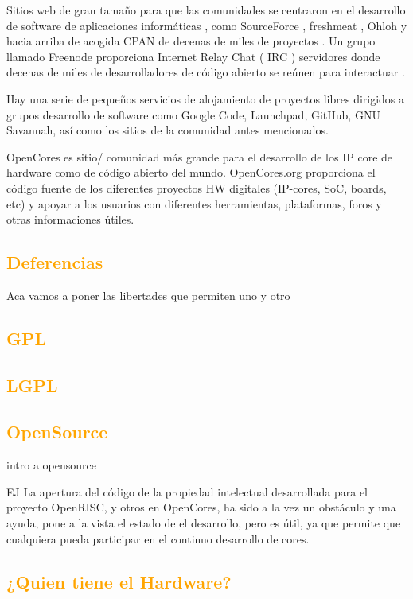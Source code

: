 \documentclass[a4paper,11pt]{article}
\begin{document}
Sitios web de gran tamaño para que las comunidades se centraron en el desarrollo de software de aplicaciones informáticas , como SourceForce , freshmeat , Ohloh y hacia arriba de acogida CPAN de decenas de miles de proyectos . Un grupo llamado Freenode proporciona Internet Relay Chat ( IRC ) servidores donde decenas de miles de desarrolladores de código abierto se reúnen para interactuar .

Hay una serie de pequeños servicios de alojamiento de proyectos libres dirigidos a grupos desarrollo de software como Google Code, Launchpad, GitHub, GNU Savannah,
así como los sitios de la comunidad antes mencionados.

OpenCores es  sitio/ comunidad más grande para el desarrollo de los  IP core de hardware como de código abierto del mundo.
OpenCores.org proporciona el código fuente de los diferentes proyectos HW digitales (IP-cores, SoC, boards, etc) y apoyar a los usuarios con diferentes herramientas, plataformas, foros y otras informaciones útiles. 

		\subsection{\textcolor{orange}{Deferencias}}%
Aca vamos a poner las libertades que permiten uno y otro
		\subsection{\textcolor{orange}{GPL}}
		\subsection{\textcolor{orange}{LGPL}}
		\subsection{\textcolor{orange}{OpenSource}}
intro a opensource

EJ
La apertura del código de la propiedad intelectual desarrollada para el proyecto OpenRISC, y otros en OpenCores, ha sido a la vez un obstáculo y una ayuda, pone a la vista el estado de el desarrollo, pero es útil, ya que permite que cualquiera pueda participar en el continuo desarrollo de cores. %
		

		\subsection{\textcolor{orange}{¿Quien tiene el Hardware?}} 
\end{document}
